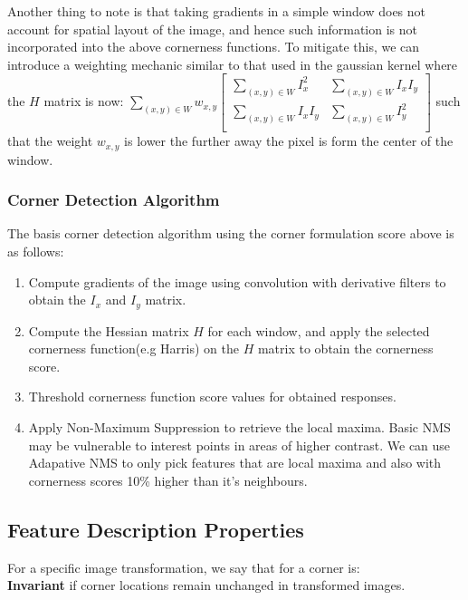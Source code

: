\documentclass[12pt]{article}
\begin{document}
Another thing to note is that taking gradients in a simple window does not account for spatial layout of the image, and hence such information is not incorporated into the above cornerness functions. To mitigate this, we can introduce a weighting mechanic similar to that used in the gaussian kernel where the $H$ matrix is now: $ \sum_{(x, y) \in W} w_{x,y} \begin{bmatrix}
\sum_{(x, y) \in W} I_x^2 & \sum_{(x, y) \in W} I_xI_y\\
\sum_{(x, y) \in W} I_xI_y & \sum_{(x, y) \in W} I_y^2\\
\end{bmatrix} $ such that the weight $w_{x, y}$ is lower the further away the pixel is form the center of the window.

\subsubsection{Corner Detection Algorithm}

The basis corner detection algorithm using the corner formulation score above is as follows:

\begin{enumerate}
\item Compute gradients of the image using convolution with derivative filters to obtain the $I_x$ and $I_y$ matrix. 
\item Compute the Hessian matrix $H$ for each window, and apply the selected cornerness function(e.g Harris) on the $H$ matrix to obtain the cornerness score.
\item Threshold cornerness function score values for obtained responses.
\item Apply Non-Maximum Suppression to retrieve the local maxima. Basic NMS may be vulnerable to interest points in areas of higher contrast. We can use Adapative NMS to only pick features that are local maxima and also with cornerness scores 10\% higher than it's neighbours. 
\end{enumerate}

\subsection{Feature Description Properties}

For a specific image transformation, we say that for a corner is:\\

\textbf{Invariant} if corner locations remain unchanged in transformed images.\\
\end{document}
